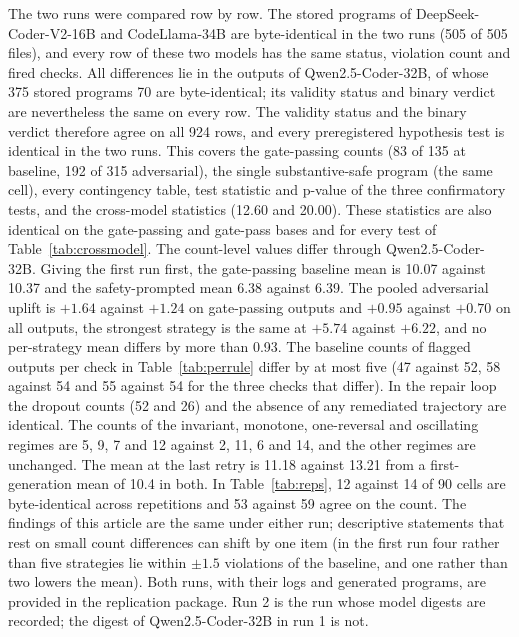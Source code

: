 \documentclass{ieeeaccess}
\begin{document}
The two runs were compared row by row. The stored programs of DeepSeek-Coder-V2-16B and
CodeLlama-34B are byte-identical in the two runs (505 of 505 files), and every row of
these two models has the same status, violation count and fired checks. All differences
lie in the outputs of Qwen2.5-Coder-32B, of whose 375 stored programs 70 are
byte-identical; its validity status and binary verdict are nevertheless the same on every
row. The validity status and the binary verdict therefore agree on all 924 rows, and
every preregistered hypothesis test is identical in the two runs. This covers the gate-passing counts (83 of
135 at baseline, 192 of 315 adversarial), the single substantive-safe program (the same
cell), every contingency table, test statistic and p-value of the three confirmatory
tests, and the cross-model statistics (12.60 and 20.00). These statistics are also identical on the
gate-passing and gate-pass bases and for every test of Table~\ref{tab:crossmodel}. The
count-level values differ
through Qwen2.5-Coder-32B. Giving the first run first, the gate-passing baseline mean is
10.07 against 10.37 and the safety-prompted mean 6.38 against 6.39. The pooled adversarial
uplift is $+1.64$ against $+1.24$ on gate-passing outputs and $+0.95$ against $+0.70$ on
all outputs, the strongest strategy is the same at $+5.74$ against $+6.22$, and no
per-strategy mean differs by more than 0.93. The baseline counts of flagged outputs per
check in Table~\ref{tab:perrule} differ by at most five (47 against 52, 58 against 54 and 55
against 54 for the three checks that differ). In the repair loop the dropout counts (52
and 26) and the absence of any remediated trajectory are identical. The counts of the invariant,
monotone, one-reversal and oscillating regimes are 5, 9, 7 and 12 against 2, 11, 6 and
14, and the other regimes are unchanged. The mean at the last retry is 11.18 against
13.21 from a first-generation mean of 10.4 in both. In Table~\ref{tab:reps}, 12 against
14 of 90 cells are byte-identical across repetitions and 53 against 59 agree on the
count. The findings of this article are the same under either run; descriptive
statements that rest on small count differences can shift by one item (in the first run
four rather than five strategies lie within $\pm 1.5$ violations of the baseline, and one
rather than two lowers the mean). Both runs, with their logs and generated programs, are
provided in the replication package. Run 2 is the run whose model digests are recorded; the digest of Qwen2.5-Coder-32B in run 1 is not.
\end{document}
